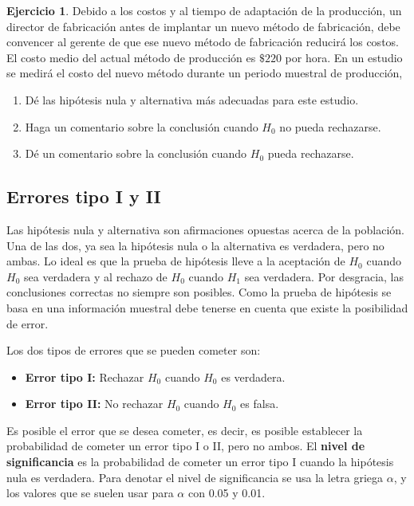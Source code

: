 \documentclass[
  11pt,
]{book}
\providecommand{\tightlist}{%
  \setlength{\itemsep}{0pt}\setlength{\parskip}{0pt}}
\theoremstyle{definition}
\theoremstyle{definition}
\theoremstyle{definition}
\newtheorem{exercise}{Ejercicio}[chapter]
\theoremstyle{definition}
\theoremstyle{remark}
\begin{document}
\begin{exercise}

Debido a los costos y al tiempo de adaptación de la producción, un director de fabricación antes de implantar un nuevo método de fabricación, debe convencer al gerente de que ese nuevo método de fabricación reducirá los costos. El costo medio del actual método de producción es \(\$220\) por hora. En un estudio se medirá el costo del nuevo método durante un periodo muestral de producción,

\begin{enumerate}
\def\labelenumi{\alph{enumi}.}
\tightlist
\item
  Dé las hipótesis nula y alternativa más adecuadas para este estudio.
\item
  Haga un comentario sobre la conclusión cuando \(H_0\) no pueda rechazarse.
\item
  Dé un comentario sobre la conclusión cuando \(H_0\) pueda rechazarse.
\end{enumerate}

\end{exercise}

\subsection{Errores tipo I y II}\label{prueba-de-hipotesis-errores}

Las hipótesis nula y alternativa son afirmaciones opuestas acerca de la población. Una de las dos, ya sea la hipótesis nula o la alternativa es verdadera, pero no ambas. Lo ideal es que la prueba de hipótesis lleve a la aceptación de \(H_0\) cuando \(H_0\) sea verdadera y al rechazo de \(H_0\) cuando \(H_1\) sea verdadera. Por desgracia, las conclusiones correctas no siempre son posibles. Como la prueba de hipótesis se basa en una información muestral debe tenerse en cuenta que existe la posibilidad de error.

Los dos tipos de errores que se pueden cometer son:

\begin{itemize}
\tightlist
\item
  \textbf{Error tipo I:} Rechazar \(H_0\) cuando \(H_0\) es verdadera.
\item
  \textbf{Error tipo II:} No rechazar \(H_0\) cuando \(H_0\) es falsa.
\end{itemize}

Es posible el error que se desea cometer, es decir, es posible establecer la probabilidad de cometer un error tipo I o II, pero no ambos. El \textbf{nivel de significancia} es la probabilidad de cometer un error tipo I cuando la hipótesis nula es verdadera. Para denotar el nivel de significancia se usa la letra griega \(\alpha\), y los valores que se suelen usar para \(\alpha\) con 0.05 y 0.01.
\end{document}
